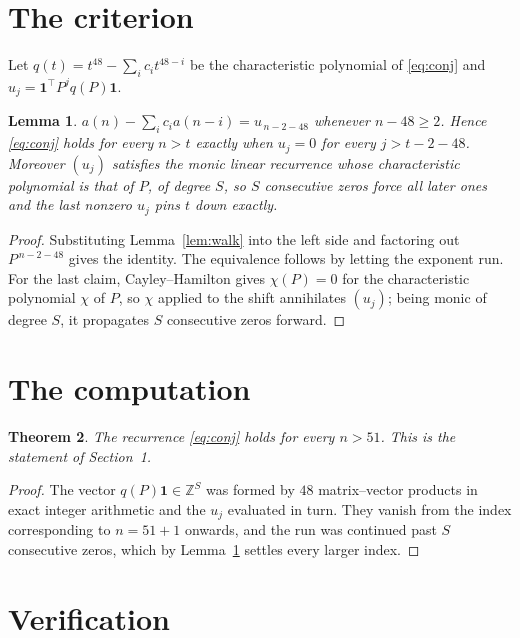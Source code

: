 \documentclass[11pt,a4paper]{article}
\theoremstyle{plain}
\newtheorem{theorem}{Theorem}
\newtheorem{lemma}[theorem]{Lemma}
\theoremstyle{definition}
\begin{document}
\section{The criterion}

Let $q(t)=t^{48}-\sum_i c_i t^{48-i}$ be the characteristic polynomial of
\eqref{eq:conj} and $u_j=\mathbf{1}^{\!\top}P^{j}q(P)\mathbf{1}$.

\begin{lemma}\label{lem:crit}
$a(n)-\sum_i c_i a(n-i)=u_{\,n-2-48}$ whenever $n-48\ge2$. Hence
\eqref{eq:conj} holds for every $n>t$ exactly when $u_j=0$ for every
$j>t-2-48$. Moreover $(u_j)$ satisfies the monic linear recurrence whose
characteristic polynomial is that of $P$, of degree $S$, so $S$ consecutive zeros force all
later ones and the last nonzero $u_j$ pins $t$ down exactly.
\end{lemma}

\begin{proof}
Substituting Lemma~\ref{lem:walk} into the left side and factoring out
$P^{\,n-2-48}$ gives the identity. The equivalence follows by letting the exponent
run. For the last claim, Cayley--Hamilton gives $\chi(P)=0$ for the characteristic
polynomial $\chi$ of $P$, so $\chi$ applied to the shift annihilates $(u_j)$; being monic of
degree $S$, it propagates $S$ consecutive zeros forward.
\end{proof}

\section{The computation}

\begin{theorem}
The recurrence \eqref{eq:conj} holds for every $n>51$. This is the statement of
Section~1.
\end{theorem}

\begin{proof}
The vector $q(P)\mathbf{1}\in\mathbb{Z}^{S}$ was formed by $48$ matrix--vector
products in exact integer arithmetic and the $u_j$ evaluated in turn. They vanish from the
index corresponding to $n=51+1$ onwards, and the run was continued past $S$ consecutive
zeros, which by Lemma~\ref{lem:crit} settles every larger index.
\end{proof}

\section{Verification}
\end{document}
